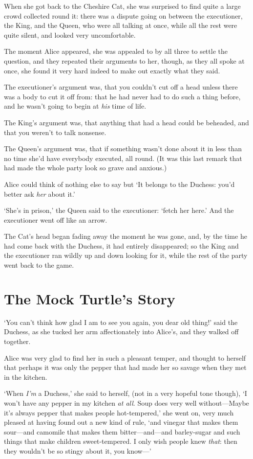 \documentclass[12pt,openany]{memoir}
\begin{document}
When she got back to the Cheshire Cat, she was surprised to find quite a large crowd collected round it: there was a dispute going on between the executioner, the King, and the Queen, who were all talking at once, while all the rest were quite silent, and looked very uncomfortable.

The moment Alice appeared, she was appealed to by all three to settle the question, and they repeated their arguments to her, though, as they all spoke at once, she found it very hard indeed to make out exactly what they said.

The executioner's argument was, that you couldn't cut off a head unless there was a body to cut it off from: that he had never had to do such a thing before, and he wasn't going to begin at \textit{his} time of life.

The King's argument was, that anything that had a head could be beheaded, and that you weren't to talk nonsense.

The Queen's argument was, that if something wasn't done about it in less than no time she'd have everybody executed, all round. (It was this last remark that had made the whole party look so grave and anxious.)

Alice could think of nothing else to say but `It belongs to the Duchess: you'd better ask \textit{her} about it.'

`She's in prison,' the Queen said to the executioner: `fetch her here.' And the executioner went off like an arrow.

The Cat's head began fading away the moment he was gone, and, by the time he had come back with the Duchess, it had entirely disappeared; so the King and the executioner ran wildly up and down looking for it, while the rest of the party went back to the game.


\chapter{The Mock Turtle's Story}

`You can't think how glad I am to see you again, you dear old thing!' said the Duchess, as she tucked her arm affectionately into Alice's, and they walked off together.

Alice was very glad to find her in such a pleasant temper, and thought to herself that perhaps it was only the pepper that had made her so savage when they met in the kitchen.

`When \textit{I'm} a Duchess,' she said to herself, (not in a very hopeful tone though), `I won't have any pepper in my kitchen \textit{at all}. Soup does very well without---Maybe it's always pepper that makes people hot-tempered,' she went on, very much pleased at having found out a new kind of rule, `and vinegar that makes them sour---and camomile that makes them bitter---and---and barley-sugar and such things that make children sweet-tempered. I only wish people knew \textit{that}: then they wouldn't be so stingy about it, you know---'
\end{document}
